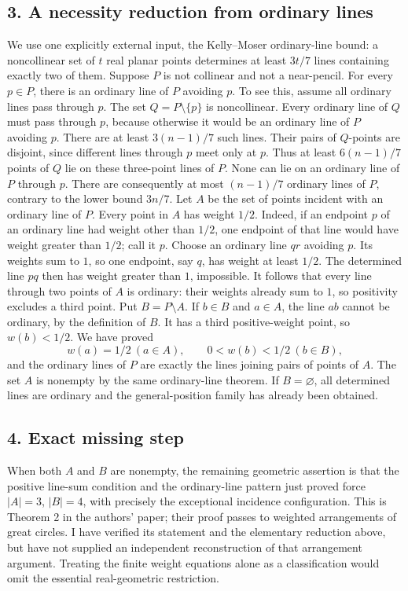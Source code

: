 \subsection*{3. A necessity reduction from ordinary lines}
We use one explicitly external input, the Kelly--Moser ordinary-line bound: a noncollinear set of $t$ real planar points determines at least $3t/7$ lines containing exactly two of them.
Suppose $P$ is not collinear and not a near-pencil. For every $p\in P$, there is an ordinary line of $P$ avoiding $p$. To see this, assume all ordinary lines pass through $p$. The set $Q=P\setminus\{p\}$ is noncollinear. Every ordinary line of $Q$ must pass through $p$, because otherwise it would be an ordinary line of $P$ avoiding $p$. There are at least $3(n-1)/7$ such lines. Their pairs of $Q$-points are disjoint, since different lines through $p$ meet only at $p$. Thus at least $6(n-1)/7$ points of $Q$ lie on these three-point lines of $P$. None can lie on an ordinary line of $P$ through $p$. There are consequently at most $(n-1)/7$ ordinary lines of $P$, contrary to the lower bound $3n/7$.
Let $A$ be the set of points incident with an ordinary line of $P$. Every point in $A$ has weight $1/2$. Indeed, if an endpoint $p$ of an ordinary line had weight other than $1/2$, one endpoint of that line would have weight greater than $1/2$; call it $p$. Choose an ordinary line $qr$ avoiding $p$. Its weights sum to $1$, so one endpoint, say $q$, has weight at least $1/2$. The determined line $pq$ then has weight greater than $1$, impossible.
It follows that every line through two points of $A$ is ordinary: their weights already sum to $1$, so positivity excludes a third point. Put $B=P\setminus A$. If $b\in B$ and $a\in A$, the line $ab$ cannot be ordinary, by the definition of $B$. It has a third positive-weight point, so $w(b)<1/2$. We have proved
\[
 w(a)=1/2\ (a\in A),\qquad 0<w(b)<1/2\ (b\in B),
\]
and the ordinary lines of $P$ are exactly the lines joining pairs of points of $A$. The set $A$ is nonempty by the same ordinary-line theorem. If $B=\varnothing$, all determined lines are ordinary and the general-position family has already been obtained.
\subsection*{4. Exact missing step}
When both $A$ and $B$ are nonempty, the remaining geometric assertion is that the positive line-sum condition and the ordinary-line pattern just proved force $|A|=3$, $|B|=4$, with precisely the exceptional incidence configuration. This is Theorem 2 in the authors' paper; their proof passes to weighted arrangements of great circles. I have verified its statement and the elementary reduction above, but have not supplied an independent reconstruction of that arrangement argument. Treating the finite weight equations alone as a classification would omit the essential real-geometric restriction.
